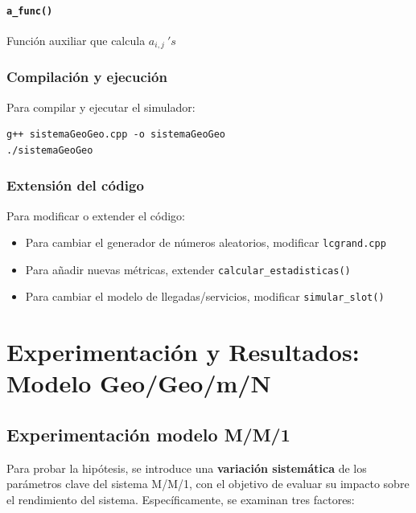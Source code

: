 \documentclass{article}
\begin{document}
\paragraph{\texttt{a\_func()}}
Función auxiliar que calcula $a_{i,j} \ 's$

\subsubsection{Compilación y ejecución}

Para compilar y ejecutar el simulador:

\begin{verbatim}
g++ sistemaGeoGeo.cpp -o sistemaGeoGeo 
./sistemaGeoGeo
\end{verbatim}

\subsubsection{Extensión del código}

Para modificar o extender el código:
\begin{itemize}
    \item Para cambiar el generador de números aleatorios, modificar \texttt{lcgrand.cpp}
    \item Para añadir nuevas métricas, extender \texttt{calcular\_estadisticas()}
    \item Para cambiar el modelo de llegadas/servicios, modificar \texttt{simular\_slot()}
\end{itemize}






\section{Experimentación y Resultados: Modelo Geo/Geo/m/N}\label{sec:exp}

\subsection{Experimentación modelo M/M/1}

Para probar la hipótesis, se introduce una \textbf{variación sistemática} de los parámetros clave del sistema M/M/1, con el objetivo de evaluar su impacto sobre el rendimiento del sistema. Específicamente, se examinan tres factores:
\end{document}

